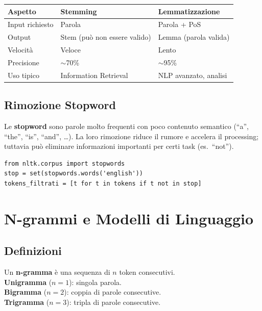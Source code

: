 \documentclass[12pt,a4paper]{article}
\begin{document}
\begin{center}
\begin{tabular}{lll}
\toprule
\textbf{Aspetto} & \textbf{Stemming} & \textbf{Lemmatizzazione} \\
\midrule
Input richiesto & Parola & Parola + PoS \\
Output & Stem (può non essere valido) & Lemma (parola valida) \\
Velocità & Veloce & Lento \\
Precisione & $\sim$70\% & $\sim$95\% \\
Uso tipico & Information Retrieval & NLP avanzato, analisi \\
\bottomrule
\end{tabular}
\end{center}

\subsection{Rimozione Stopword}

Le \textbf{stopword} sono parole molto frequenti con poco contenuto semantico (``a'', ``the'', ``is'', ``and'', \ldots). La loro rimozione riduce il rumore e accelera il processing; tuttavia può eliminare informazioni importanti per certi task (es.\ ``not'').

\begin{lstlisting}
from nltk.corpus import stopwords
stop = set(stopwords.words('english'))
tokens_filtrati = [t for t in tokens if t not in stop]
\end{lstlisting}

\section{N-grammi e Modelli di Linguaggio}

\subsection{Definizioni}

\begin{defbox}
Un \textbf{n-gramma} è una sequenza di $n$ token consecutivi.\\
\textbf{Unigramma} ($n=1$): singola parola.\\
\textbf{Bigramma} ($n=2$): coppia di parole consecutive.\\
\textbf{Trigramma} ($n=3$): tripla di parole consecutive.
\end{defbox}
\end{document}
